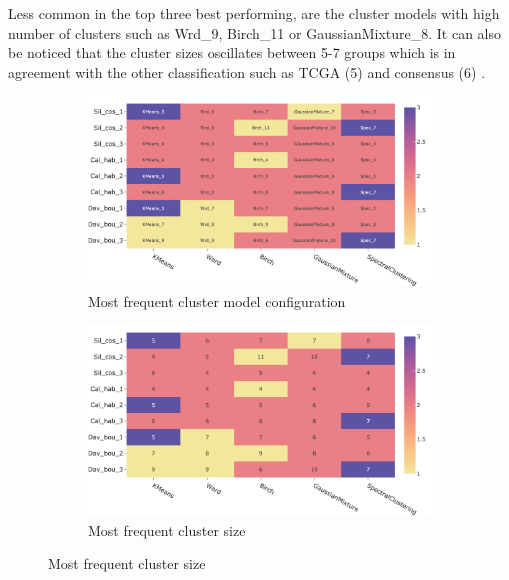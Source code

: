 Less common in the top three best performing, are the cluster models with high number of clusters such as Wrd\_9, Birch\_11 or GaussianMixture\_8. It can also be noticed that the cluster sizes oscillates between 5-7 groups which is in agreement with the other classification such as TCGA (5) and consensus (6) \citep{Robertson2017-mg,Kamoun2020-tj}.

\begin{figure}[!t]
    \centering
    \small
    \begin{subfigure}[!t]{0.8\textwidth}
        \includegraphics[width=\textwidth]{Sections/ClusteringAnalysis/Resources/cs_top3/top3_cs_gen_top3_heatmap_pca.png}
        \caption{Most frequent cluster model configuration}
        \label{fig:cs:heatmap_gen}
    \end{subfigure}
    \centering
    \begin{subfigure}[!t]{0.8\textwidth}
        \includegraphics[width=\textwidth]{Sections/ClusteringAnalysis/Resources/cs_top3/top3_cs_size_top3_heatmap_pca.png}
        \caption{Most frequent cluster size}
        \label{fig:cs:heatmap_cs}
    \end{subfigure}

\end{figure}

